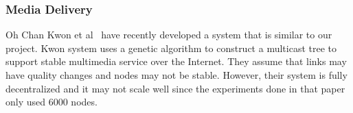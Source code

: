 \subsubsection{Media Delivery}

Oh Chan Kwon et al~\cite{51043858} have recently developed a system that is similar to our project. Kwon system uses a genetic algorithm to construct a multicast tree to support stable multimedia service over the Internet. They assume that links may have quality changes and nodes may not be stable. However, their system is fully decentralized and it may not scale well
since the experiments done in that paper only used 6000 nodes.
